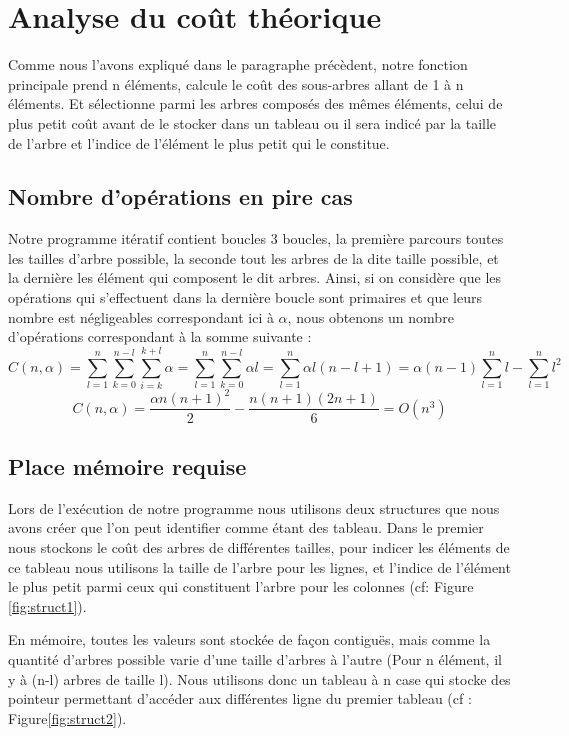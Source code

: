 \documentclass[a4paper, 10pt, french]{article}
\begin{document}
\section{Analyse du coût théorique}
 Comme nous l'avons expliqué dans le paragraphe précèdent, notre fonction principale prend n éléments, calcule le coût des sous-arbres allant de 1 à n éléments. Et sélectionne parmi les arbres composés des mêmes éléments, celui de plus petit coût avant de le stocker dans un tableau ou il sera indicé par la taille de l'arbre et l'indice de l'élément le plus petit qui le constitue.



  \subsection{Nombre  d'opérations en pire cas}
     Notre programme itératif contient boucles 3 boucles, la première parcours toutes les tailles d'arbre possible, la seconde tout les arbres de la dite taille possible, et la dernière les élément qui composent le dit arbres. Ainsi, si on considère que les opérations qui s'effectuent dans la dernière boucle sont primaires et que leurs nombre est négligeables correspondant ici à $\alpha$, nous obtenons un nombre d'opérations correspondant à la somme suivante :
      $$C(n,\alpha) = \sum_{l=1}^{n} \sum_{k=0}^{n-l} \sum_{i=k}^{k+l} \alpha
                    = \sum_{l=1}^{n} \sum_{k=0}^{n-l} \alpha l
                    = \sum_{l=1}^{n} \alpha l (n-l+1)
                    = \alpha (n-1) \sum_{l=1}^{n} l - \sum_{l=1}^{n} l^2 $$
      $$C(n,\alpha) = \frac{\alpha n (n+1)^2}{2} - \frac{n(n+1)(2n+1)}{6}
                    = O(n^3)$$

  \subsection{Place mémoire requise}
 Lors de l'exécution de notre programme nous utilisons deux structures que nous avons créer que l'on peut identifier comme étant des tableau. Dans le premier nous stockons le coût des arbres de différentes tailles, pour indicer les éléments de ce tableau nous utilisons la taille de l'arbre pour les lignes, et l'indice de l'élément le plus petit parmi ceux qui constituent l'arbre pour les colonnes (cf: Figure \ref{fig:struct1}).



 En mémoire, toutes les valeurs sont stockée de façon contiguës, mais comme la quantité d'arbres possible varie d'une taille d'arbres à l'autre (Pour n élément, il y à (n-l) arbres de taille l). Nous utilisons donc un tableau à n case qui stocke des pointeur permettant d'accéder aux différentes ligne du premier tableau (cf : Figure\ref{fig:struct2}).
\end{document}
